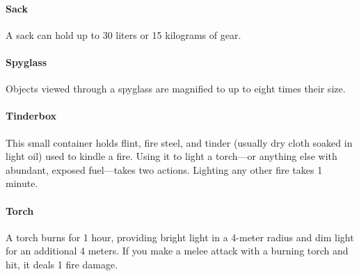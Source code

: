     \paragraph{Sack}
        A sack can hold up to 30 liters or 15 kilograms of gear.
    \paragraph{Spyglass}
        Objects viewed through a spyglass are magnified to up to eight times their size.
    \paragraph{Tinderbox}
        This small container holds flint, fire steel, and tinder (usually dry cloth soaked in light oil) used to kindle a fire.
        Using it to light a torch---or anything else with abundant, exposed fuel---takes two actions.
        Lighting any other fire takes 1 minute.
    \paragraph{Torch}
        A torch burns for 1 hour, providing bright light in a 4-meter radius and dim light for an additional 4 meters.
        If you make a melee attack with a burning torch and hit, it deals 1 fire damage.

